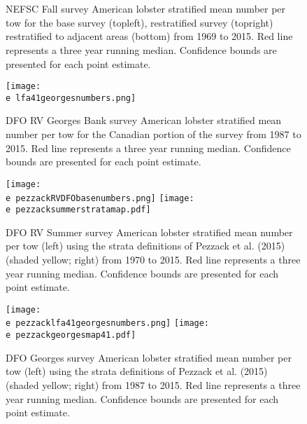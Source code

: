 \documentclass[11pt]{article}
\newcommand{\e}{/backup/bio_data/bio.lobster/figures/} %
\begin{document}
\begin{figure}
\centering
{}
\\
\\

\caption{NEFSC Fall survey American lobster stratified mean number per tow for the base survey (topleft), restratified survey (topright) restratified to adjacent areas (bottom) from 1969 to 2015. Red line represents a three year running median. Confidence bounds are presented for each point estimate. }
\end{figure}
\clearpage

\begin{figure}

    \texttt{[image: \\e lfa41georgesnumbers.png]}
    \caption{DFO RV Georges Bank survey American lobster stratified mean number per tow for the Canadian portion of the survey from 1987 to 2015. Red line represents a three year running median. Confidence bounds are presented for each point estimate.}

\end{figure}

\begin{landscape}
\begin{figure}
\centering
    \texttt{[image: \\e pezzackRVDFObasenumbers.png]} 
    \texttt{[image: \\e pezzacksummerstratamap.pdf]} 
    
    \caption{DFO RV Summer survey American lobster stratified mean number per tow (left) using the strata definitions of Pezzack et al. (2015) (shaded yellow; right) from 1970 to 2015. Red line represents a three year running median. Confidence bounds are presented for each point estimate.}

\end{figure}
\end{landscape}


\begin{landscape}
\begin{figure}
\centering
    \texttt{[image: \\e pezzacklfa41georgesnumbers.png]} 
    \texttt{[image: \\e pezzackgeorgesmap41.pdf]} 
    
    \caption{DFO Georges survey American lobster stratified mean number per tow (left) using the strata definitions of Pezzack et al. (2015) (shaded yellow; right) from 1987 to 2015. Red line represents a three year running median. Confidence bounds are presented for each point estimate.}

\end{figure}
\end{landscape}
\end{document}
